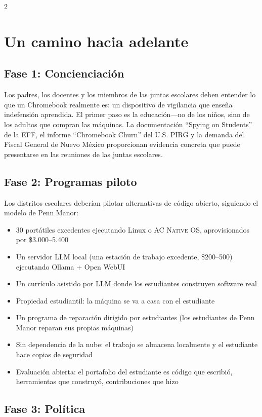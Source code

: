 \documentclass[11pt, a4paper]{article}
\newcommand{\acos}{\textsc{AC Native OS}}
\begin{document}
\begin{multicols}{2}
\section{Un camino hacia adelante}

\subsection{Fase 1: Concienciación}

Los padres, los docentes y los miembros de las juntas escolares deben entender lo que un Chromebook realmente es: un dispositivo de vigilancia que enseña indefensión aprendida. El primer paso es la educación---no de los niños, sino de los adultos que compran las máquinas. La documentación ``Spying on Students'' de la EFF, el informe ``Chromebook Churn'' del U.S. PIRG y la demanda del Fiscal General de Nuevo México proporcionan evidencia concreta que puede presentarse en las reuniones de las juntas escolares.

\subsection{Fase 2: Programas piloto}

Los distritos escolares deberían pilotar alternativas de código abierto, siguiendo el modelo de Penn Manor:

\begin{itemize}
  \item 30 portátiles excedentes ejecutando Linux o \acos{}, aprovisionados por \$3.000--5.400
  \item Un servidor LLM local (una estación de trabajo excedente, \$200--500) ejecutando Ollama + Open WebUI
  \item Un currículo asistido por LLM donde los estudiantes construyen software real
  \item Propiedad estudiantil: la máquina se va a casa con el estudiante
  \item Un programa de reparación dirigido por estudiantes (los estudiantes de Penn Manor reparan sus propias máquinas)
  \item Sin dependencia de la nube: el trabajo se almacena localmente y el estudiante hace copias de seguridad
  \item Evaluación abierta: el portafolio del estudiante es código que escribió, herramientas que construyó, contribuciones que hizo
\end{itemize}

\subsection{Fase 3: Política}


\end{multicols}
\end{document}
